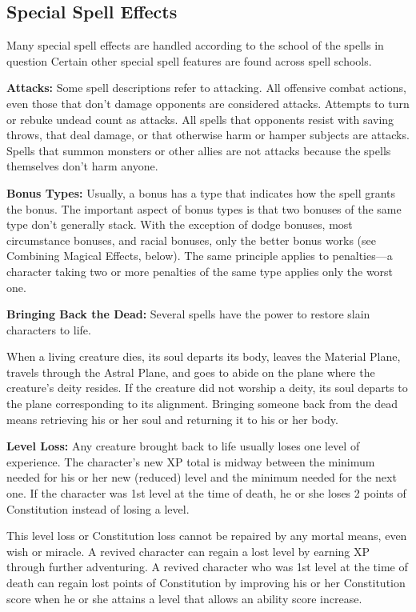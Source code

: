 \subsection{Special Spell Effects}
Many special spell effects are handled according to the school of the spells in question Certain other special spell features are found across spell schools.

\textbf{Attacks:} Some spell descriptions refer to attacking. All offensive combat actions, even those that don't damage opponents are considered attacks. Attempts to turn or rebuke undead count as attacks. All spells that opponents resist with saving throws, that deal damage, or that otherwise harm or hamper subjects are attacks. Spells that summon monsters or other allies are not attacks because the spells themselves don't harm anyone.

\textbf{Bonus Types:} Usually, a bonus has a type that indicates how the spell grants the bonus. The important aspect of bonus types is that two bonuses of the same type don't generally stack. With the exception of dodge bonuses, most circumstance bonuses, and racial bonuses, only the better bonus works (see Combining Magical Effects, below). The same principle applies to penalties---a character taking two or more penalties of the same type applies only the worst one.

\textbf{Bringing Back the Dead:} Several spells have the power to restore slain characters to life.

When a living creature dies, its soul departs its body, leaves the Material Plane, travels through the Astral Plane, and goes to abide on the plane where the creature's deity resides. If the creature did not worship a deity, its soul departs to the plane corresponding to its alignment. Bringing someone back from the dead means retrieving his or her soul and returning it to his or her body.

\textbf{Level Loss:} Any creature brought back to life usually loses one level of experience. The character's new XP total is midway between the minimum needed for his or her new (reduced) level and the minimum needed for the next one. If the character was 1st level at the time of death, he or she loses 2 points of Constitution instead of losing a level.

This level loss or Constitution loss cannot be repaired by any mortal means, even wish or miracle. A revived character can regain a lost level by earning XP through further adventuring. A revived character who was 1st level at the time of death can regain lost points of Constitution by improving his or her Constitution score when he or she attains a level that allows an ability score increase.

